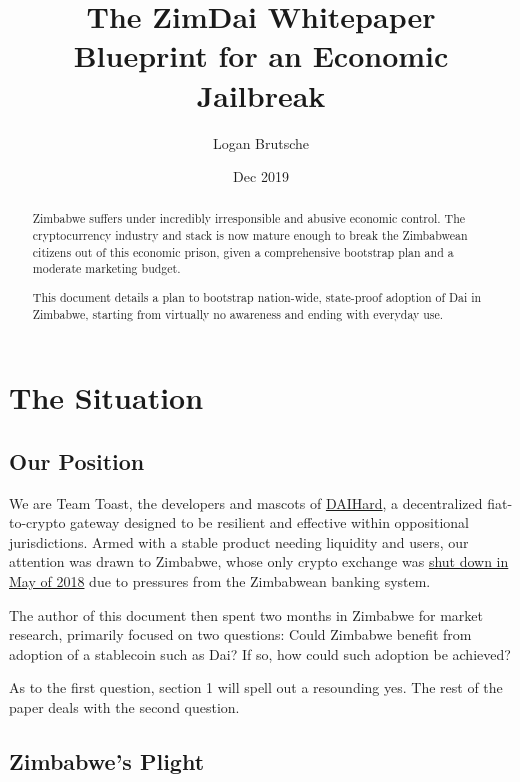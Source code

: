 \documentclass{article}
\title{The ZimDai Whitepaper\\
	\large Blueprint for an Economic Jailbreak
}
\date{Dec 2019}
\author{Logan Brutsche}
\begin{document}

\maketitle
\begin{abstract}
	\setlength{\parskip}{1em}
	Zimbabwe suffers under incredibly irresponsible and abusive economic control. The cryptocurrency industry and stack is now mature enough to break the Zimbabwean citizens out of this economic prison, given a comprehensive bootstrap plan and a moderate marketing budget.
		
	This document details a plan to bootstrap nation-wide, state-proof adoption of Dai in Zimbabwe, starting from virtually no awareness and ending with everyday use.
\end{abstract}

\newpage
{}
\tableofcontents

\setlength{\parskip}{0.5em}

\newpage
{}
\section{The Situation} \label{situation}

\subsection{Our Position} \label{position}

We are Team Toast, the developers and mascots of \href{daihard.io}{DAIHard}, a decentralized fiat-to-crypto gateway designed to be resilient and effective within oppositional jurisdictions. Armed with a stable product needing liquidity and users, our attention was drawn to Zimbabwe, whose only crypto exchange was \href{https://www.techzim.co.zw/2018/05/golix-ordered-to-shut-down-by-rbz/}{shut down in May of 2018} due to pressures from the Zimbabwean banking system.

The author of this document then spent two months in Zimbabwe for market research, primarily focused on two questions: Could Zimbabwe benefit from adoption of a stablecoin such as Dai? If so, how could such adoption be achieved?

As to the first question, section 1 will spell out a resounding yes. The rest of the paper deals with the second question.

\subsection{Zimbabwe's Plight} \label{zimbabwe}
\end{document}
